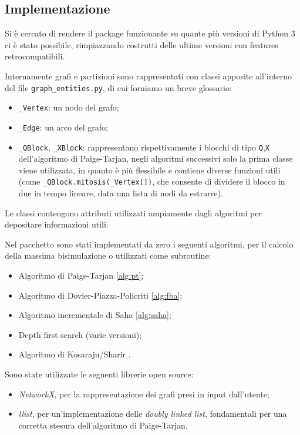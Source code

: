 \subsection{Implementazione}
Si è cercato di rendere il package funzionante su quante più versioni di Python 3 ci è stato possibile, rimpiazzando costrutti delle ultime versioni con features retrocompatibili.

Internamente grafi e partizioni sono rappresentati con classi apposite all'interno del file \verb|graph_entities.py|, di cui forniamo un breve glossario:
\begin{itemize}
    \item \verb|_Vertex|: un nodo del grafo;
    \item \verb|_Edge|: un arco del grafo;
    \item \verb|_QBlock|, \verb|_XBlock|: rappresentano rispettivamente i blocchi di tipo \verb|Q|,\verb|X| dell'algoritmo di Paige-Tarjan, negli algoritmi successivi solo la prima classe viene utilizzata, in quanto è più flessibile e contiene diverse funzioni utili (come \verb|_QBlock.mitosis(_Vertex[])|, che consente di dividere il blocco in due in tempo lineare, data una lista di nodi da estrarre).
\end{itemize}
Le classi contengono attributi utilizzati ampiamente dagli algoritmi per depositare informazioni utili.

Nel pacchetto sono stati implementati da zero i seguenti algoritmi, per il calcolo della massima bisimulazione o utilizzati come subroutine:
\begin{itemize}
    \item Algoritmo di Paige-Tarjan \ref{alg:pt};
    \item Algoritmo di Dovier-Piazza-Policriti \ref{alg:fba};
    \item Algoritmo incrementale di Saha \ref{alg:saha};
    \item Depth first search (varie versioni);
    \item Algoritmo di Kosaraju/Sharir \cite{sharir}.
\end{itemize}

Sono state utilizzate le seguenti librerie open source:
\begin{itemize}
    \item \emph{NetworkX}, per la rappresentazione dei grafi presi in input dall'utente;
    \item \emph{llist}, per un'implementazione delle \emph{doubly linked list}, fondamentali per una corretta stesura dell'algoritmo di Paige-Tarjan.
\end{itemize}
